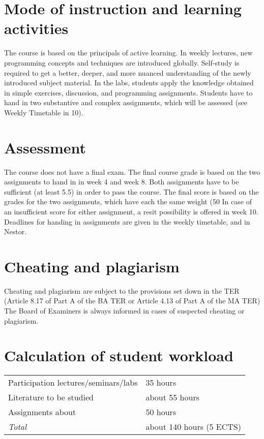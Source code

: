 \documentclass[a4paper,12pt]{article}
\begin{document}
\section{Mode of instruction and learning activities}
The course is based on the principals of active learning. In weekly lectures,
new programming concepts and techniques are introduced globally. Self-study is
required to get a better, deeper, and more nuanced understanding of the newly
introduced subject material. In the labs, students apply the knowledge obtained
in simple exercises, discussion, and programming assignments. Students have to
hand in two substantive and complex assignments, which will be assessed (see
Weekly Timetable in 10).

\section{Assessment}
The course does not have a final exam. The final course grade is based on the
two assignments to hand in in week 4 and week 8. Both assignments have to be
sufficient (at least 5.5) in order to pass the course. The final score is based
on the grades for the two assignments, which have each the same weight (50%
In case of an insufficient score for either assignment, a resit possibility is
offered in week 10. Deadlines for handing in assignments are given in the
weekly timetable, and in Nestor.

\section{Cheating and plagiarism}
Cheating and plagiarism are subject to the provisions set down in the TER
(Article 8.17 of Part A of the BA TER or Article 4.13 of Part A of the MA TER)
The Board of Examiners is always informed in cases of suspected cheating or
plagiarism.

\section{Calculation of student workload}
\begin{tabular}{ll}
	Participation lectures/seminars/labs 	& 35 hours \\
	Literature to be studied 				& about 55 hours \\
	Assignments about 						& 50 hours \\
	\emph{Total} 							& about 140 hours (5 ECTS) \\
\end{tabular}
\end{document}
